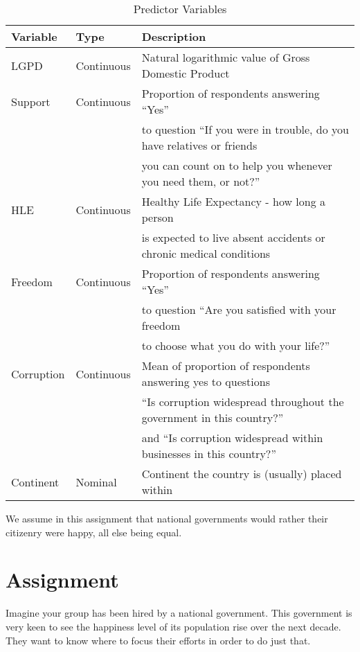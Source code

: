 \documentclass[11pt,a4paper]{article}
\begin{document}
\begin{table}
\hspace{-2cm}
    \begin{tabular}{|l|l|l|}
    
    \hline
       \textbf{Variable}  & \textbf{Type} & \textbf{Description}\\
       \hline
      LGPD   & Continuous & Natural logarithmic value of Gross Domestic Product \\
      \hline
       Support  & Continuous & Proportion of respondents answering ``Yes''\\
       & &to question ``If you were in trouble, do you have relatives or friends\\
       & & you can count on to help you whenever you need them, or not?''\\
         \hline
        HLE & Continuous & Healthy Life Expectancy - how long a person \\
        & & is expected to live absent accidents or chronic medical conditions\\
        \hline
       Freedom  & Continuous & Proportion of respondents answering ``Yes''\\
       & &to question “Are you satisfied with your freedom \\
       & & to choose what you do with your life?”\\
         \hline
       Corruption  & Continuous &  Mean of proportion of respondents answering yes to questions \\
       & &   ``Is corruption widespread throughout the government in this country?''  \\
       & & and ``Is corruption widespread within businesses in this country?''\\
         \hline
       Continent  & Nominal & Continent the country is (usually) placed within\\
       \hline
    \end{tabular}
    \caption{Predictor Variables}
    \label{tab:my_label}
\end{table}
 
We assume in this assignment that national governments would rather their citizenry were happy, all else being equal.

\section{Assignment}

Imagine your group has been hired by a national government. This government is very keen to see the happiness level of its population rise over the next decade. They want to know where to focus their efforts in order to do just that.
\end{document}
